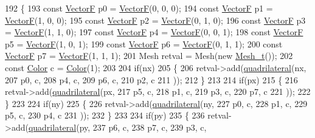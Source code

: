 \begin{DoxyCode}
192     \{
193         \textcolor{keyword}{const} \hyperlink{structVectorF}{VectorF} p0 = \hyperlink{structVectorF}{VectorF}(0, 0, 0);
194         \textcolor{keyword}{const} \hyperlink{structVectorF}{VectorF} p1 = \hyperlink{structVectorF}{VectorF}(1, 0, 0);
195         \textcolor{keyword}{const} \hyperlink{structVectorF}{VectorF} p2 = \hyperlink{structVectorF}{VectorF}(0, 1, 0);
196         \textcolor{keyword}{const} \hyperlink{structVectorF}{VectorF} p3 = \hyperlink{structVectorF}{VectorF}(1, 1, 0);
197         \textcolor{keyword}{const} \hyperlink{structVectorF}{VectorF} p4 = \hyperlink{structVectorF}{VectorF}(0, 0, 1);
198         \textcolor{keyword}{const} \hyperlink{structVectorF}{VectorF} p5 = \hyperlink{structVectorF}{VectorF}(1, 0, 1);
199         \textcolor{keyword}{const} \hyperlink{structVectorF}{VectorF} p6 = \hyperlink{structVectorF}{VectorF}(0, 1, 1);
200         \textcolor{keyword}{const} \hyperlink{structVectorF}{VectorF} p7 = \hyperlink{structVectorF}{VectorF}(1, 1, 1);
201         Mesh retval = Mesh(\textcolor{keyword}{new} \hyperlink{classMesh__t}{Mesh\_t}());
202         \textcolor{keyword}{const} \hyperlink{structColor}{Color} c = \hyperlink{structColor}{Color}(1);
203 
204         \textcolor{keywordflow}{if}(nx)
205         \{
206             retval->add(\hyperlink{namespaceGenerate_afd427e6ee5edcf5cab7d521048466496}{quadrilateral}(nx,
207                         p0, c,
208                         p4, c,
209                         p6, c,
210                         p2, c
211                         ));
212         \}
213 
214         \textcolor{keywordflow}{if}(px)
215         \{
216             retval->add(\hyperlink{namespaceGenerate_afd427e6ee5edcf5cab7d521048466496}{quadrilateral}(px,
217                         p5, c,
218                         p1, c,
219                         p3, c,
220                         p7, c
221                         ));
222         \}
223 
224         \textcolor{keywordflow}{if}(ny)
225         \{
226             retval->add(\hyperlink{namespaceGenerate_afd427e6ee5edcf5cab7d521048466496}{quadrilateral}(ny,
227                         p0, c,
228                         p1, c,
229                         p5, c,
230                         p4, c
231                         ));
232         \}
233 
234         \textcolor{keywordflow}{if}(py)
235         \{
236             retval->add(\hyperlink{namespaceGenerate_afd427e6ee5edcf5cab7d521048466496}{quadrilateral}(py,
237                         p6, c,
238                         p7, c,
239                         p3, c,

\end{DoxyCode}
